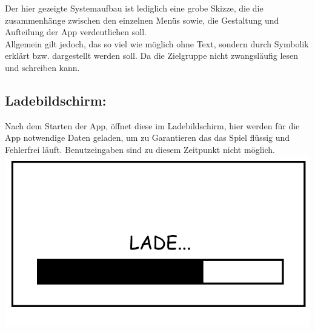 \documentclass{scrartcl}
\begin{document}
Der hier gezeigte Systemaufbau ist lediglich eine grobe \glqq Skizze\grqq,
die die zusammenhänge zwischen den einzelnen Menüs sowie, 
die Gestaltung und Aufteilung der App verdeutlichen soll.\\
Allgemein gilt jedoch, das so viel wie möglich ohne Text, sondern durch Symbolik erklärt bzw. dargestellt werden soll. Da die Zielgruppe nicht zwangsläufig lesen und schreiben kann.\\

\begin{enumerate}
	\begin{minipage}{1\textwidth}
		\item \subsection*{Ladebildschirm:} \label{appaufbau:Ladebildschirm}
		Nach dem Starten der App, öffnet diese im Ladebildschirm, hier werden für die App notwendige Daten geladen, um zu Garantieren das das Spiel flüssig und Fehlerfrei läuft. Benutzeingaben sind zu diesem Zeitpunkt nicht möglich.\\
		\includegraphics[width=\textwidth]{assets/LoadScreen}
	\end{minipage}
	
	\begin{minipage}{1\textwidth}
		

\end{minipage}
\end{enumerate}
\end{document}

